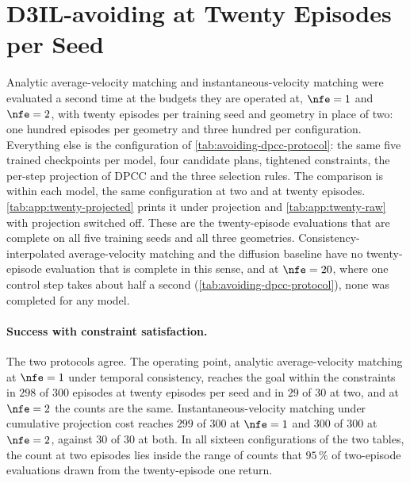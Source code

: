 \section{D3IL-avoiding at Twenty Episodes per Seed}\label{app:avoiding-twenty}

Analytic average-velocity matching and instantaneous-velocity matching were evaluated a second time at
the budgets they are operated at, $\nfe=1$ and $\nfe=2$, with twenty episodes per training seed and
geometry in place of two: one hundred episodes per geometry and three hundred per configuration.
Everything else is the configuration of \autoref{tab:avoiding-dpcc-protocol}: the same five trained
checkpoints per model, four candidate plans, tightened constraints, the per-step projection of \ac{DPCC}
and the three selection rules. The comparison is within each model, the same configuration at two and at
twenty episodes. \autoref{tab:app:twenty-projected} prints it under projection and
\autoref{tab:app:twenty-raw} with projection switched off.
These are the twenty-episode evaluations that are complete on all five training seeds and all three
geometries. Consistency-interpolated average-velocity matching and the diffusion baseline have no
twenty-episode evaluation that is complete in this sense, and at $\nfe=20$, where one control step takes
about half a second (\autoref{tab:avoiding-dpcc-protocol}), none was completed for any model.

\paragraph{Success with constraint satisfaction.}
The two protocols agree. The operating point, analytic average-velocity matching at $\nfe=1$ under temporal
consistency, reaches the goal within the constraints in $298$ of $300$ episodes at twenty episodes per seed
and in $29$ of $30$ at two, and at $\nfe=2$ the counts are the same. Instantaneous-velocity matching under
cumulative projection cost reaches $299$ of $300$ at $\nfe=1$ and $300$ of $300$ at $\nfe=2$, against
$30$ of $30$ at both. In all sixteen configurations of the two tables, the count at two episodes lies
inside the range of counts that $95\,\%$ of two-episode evaluations drawn from the twenty-episode one
return.

